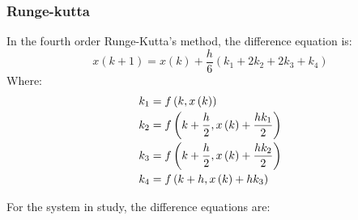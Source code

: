     \subsubsection{Runge-kutta}
    In the fourth order Runge-Kutta's method, the difference equation is:
    \begin{equation}
        x\left(k+1\right) = x\left(k\right) + \dfrac{h}{6}\left(k_1 + 2k_2 + 2k_3 + k_4\right)
    \end{equation}
    Where:
    \begin{equation}
	\begin{array}{ll}
        k_1 = f\left(k, x\left(k\right)\right)\vspace{1mm} \\
        k_2 = f\left(k + \dfrac{h}{2}, x\left(k\right) + \dfrac{hk_1}{2}\right)\vspace{1mm} \\
        k_3 = f\left(k + \dfrac{h}{2}, x\left(k\right) + \dfrac{hk_2}{2}\right)\vspace{1mm} \\
        k_4 = f\left(k + h, x\left(k\right) + hk_3\right)
    \end{array}
    \end{equation}
    
    For the system in study, the difference equations are:
    
